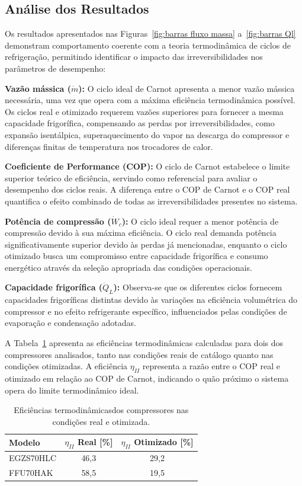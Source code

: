 \subsection{Análise dos Resultados}

Os resultados apresentados nas Figuras~\ref{fig:barras fluxo massa} a~\ref{fig:barras Ql} demonstram comportamento coerente com a teoria termodinâmica de ciclos de refrigeração, permitindo identificar o impacto das irreversibilidades nos parâmetros de desempenho:

\textbf{Vazão mássica ($\dot{m}$):} O ciclo ideal de Carnot apresenta a menor vazão mássica necessária, uma vez que opera com a máxima eficiência termodinâmica possível. Os ciclos real e otimizado requerem vazões superiores para fornecer a mesma capacidade frigorífica, compensando as perdas por irreversibilidades, como expansão isentálpica, superaquecimento do vapor na descarga do compressor e diferenças finitas de temperatura nos trocadores de calor.

\textbf{Coeficiente de Performance (COP):} O ciclo de Carnot estabelece o limite superior teórico de eficiência, servindo como referencial para avaliar o desempenho dos ciclos reais. A diferença entre o COP de Carnot e o COP real quantifica o efeito combinado de todas as irreversibilidades presentes no sistema.

\textbf{Potência de compressão ($\dot{W}_c$):} O ciclo ideal requer a menor potência de compressão devido à sua máxima eficiência. O ciclo real demanda potência significativamente superior devido às perdas já mencionadas, enquanto o ciclo otimizado busca um compromisso entre capacidade frigorífica e consumo energético através da seleção apropriada das condições operacionais.

\textbf{Capacidade frigorífica ($\dot{Q}_L$):} Observa-se que os diferentes ciclos fornecem capacidades frigoríficas distintas devido às variações na eficiência volumétrica do compressor e no efeito refrigerante específico, influenciados pelas condições de evaporação e condensação adotadas.

A Tabela~\ref{tab:eficiencias termo} apresenta as eficiências termodinâmicas calculadas para dois dos compressores analisados, tanto nas condições reais de catálogo quanto nas condições otimizadas. A eficiência $\eta_{II}$ representa a razão entre o COP real e otimizado em relação ao COP de Carnot, indicando o quão próximo o sistema opera do limite termodinâmico ideal.

\begin{table}[ht]
\centering
\begin{tabular}{|l|c|c|}
\hline
\textbf{Modelo} & \textbf{$\eta_{II}$ Real [\%]} & \textbf{$\eta_{II}$ Otimizado [\%]} \\ \hline
EGZS70HLC & 46,3 & 29,2 \\ \hline
FFU70HAK & 58,5 & 19,5 \\ \hline
\end{tabular}
\caption{Eficiências termodinâmicasdos compressores nas condições real e otimizada.}
\label{tab:eficiencias termo}
\end{table}

